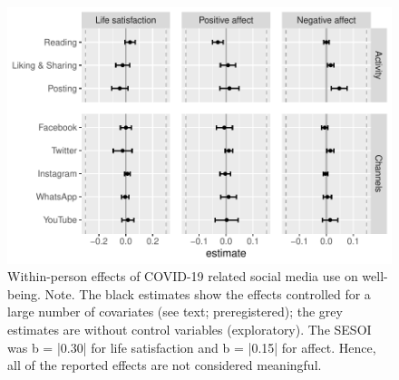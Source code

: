 \documentclass[
  man,floatsintext]{apa7}
\begin{document}
\begin{figure}
\includegraphics[width=\textwidth]{manuscript_files/figure-latex/fig-within-1} \caption{Within-person effects of COVID-19 related social media use on well-being. Note. The black estimates show the effects controlled for a large number of covariates (see text; preregistered); the grey estimates are without control variables (exploratory). The SESOI was b = |0.30| for life satisfaction and b = |0.15| for affect. Hence, all of the reported effects are not considered meaningful.}\label{fig:fig-within}
\end{figure}
\end{document}
